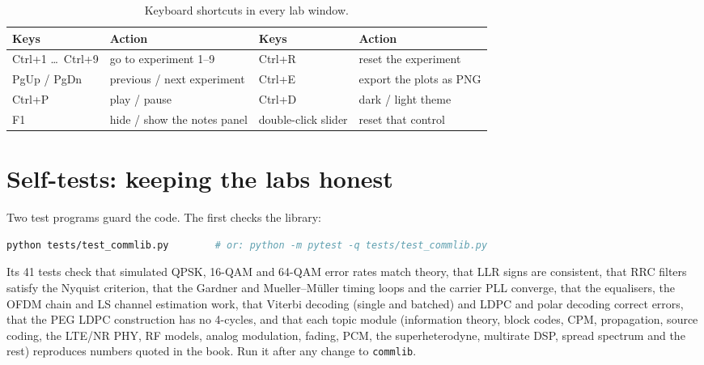 
\begin{table}[htbp]\centering\small
\caption{Keyboard shortcuts in every lab window.}\label{tab:appB:keys}
\begin{tabular}{@{}ll@{\qquad}ll@{}}
\toprule
Keys & Action & Keys & Action\\
\midrule
Ctrl+1 \ldots\ Ctrl+9 & go to experiment 1--9 & Ctrl+R & reset the experiment\\
PgUp / PgDn & previous / next experiment & Ctrl+E & export the plots as PNG\\
Ctrl+P & play / pause & Ctrl+D & dark / light theme\\
F1 & hide / show the notes panel & double-click slider & reset that control\\
\bottomrule
\end{tabular}
\end{table}

\section{Self-tests: keeping the labs honest}
\label{sec:appB:rebuild}

Two test programs guard the code. The first checks the library:
\begin{lstlisting}[language=bash]
python tests/test_commlib.py        # or: python -m pytest -q tests/test_commlib.py
\end{lstlisting}
Its 41 tests check that simulated QPSK, 16-QAM and 64-QAM error rates match theory, that LLR signs
are consistent, that RRC filters satisfy the Nyquist criterion, that the Gardner and
Mueller--M\"uller timing loops and the carrier PLL converge, that the equalisers, the OFDM chain and
LS channel estimation work, that Viterbi decoding (single and batched) and LDPC and polar decoding
correct errors, that the PEG LDPC construction has no 4-cycles, and that each topic module
(information theory, block codes, CPM, propagation, source coding, the LTE/NR PHY, RF models,
analog modulation, fading, PCM, the superheterodyne, multirate DSP, spread spectrum and the rest)
reproduces numbers quoted in the book. Run it after any change to \texttt{commlib}.

